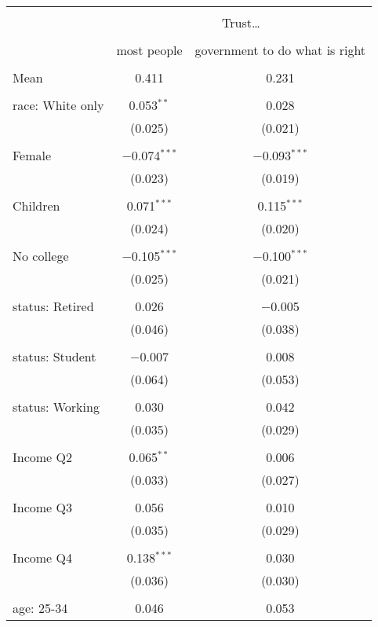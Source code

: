 
\begin{tabular}{@{\extracolsep{5pt}}lcc} 
\\[-1.8ex]\hline 
\hline \\[-1.8ex] 
 & \multicolumn{2}{c}{Trust…} \\ 
\cline{2-3} 
\\[-1.8ex] & most people & government to do what is right \\ 
\hline \\[-1.8ex] 
 Mean & 0.411 & 0.231  \\ \hline \\[-1.8ex] race: White only & 0.053$^{**}$ & 0.028 \\ 
  & (0.025) & (0.021) \\ 
  & & \\ 
 Female & $-$0.074$^{***}$ & $-$0.093$^{***}$ \\ 
  & (0.023) & (0.019) \\ 
  & & \\ 
 Children & 0.071$^{***}$ & 0.115$^{***}$ \\ 
  & (0.024) & (0.020) \\ 
  & & \\ 
 No college & $-$0.105$^{***}$ & $-$0.100$^{***}$ \\ 
  & (0.025) & (0.021) \\ 
  & & \\ 
 status: Retired & 0.026 & $-$0.005 \\ 
  & (0.046) & (0.038) \\ 
  & & \\ 
 status: Student & $-$0.007 & 0.008 \\ 
  & (0.064) & (0.053) \\ 
  & & \\ 
 status: Working & 0.030 & 0.042 \\ 
  & (0.035) & (0.029) \\ 
  & & \\ 
 Income Q2 & 0.065$^{**}$ & 0.006 \\ 
  & (0.033) & (0.027) \\ 
  & & \\ 
 Income Q3 & 0.056 & 0.010 \\ 
  & (0.035) & (0.029) \\ 
  & & \\ 
 Income Q4 & 0.138$^{***}$ & 0.030 \\ 
  & (0.036) & (0.030) \\ 
  & & \\ 
 age: 25-34 & 0.046 & 0.053 \\ 

\end{tabular}
